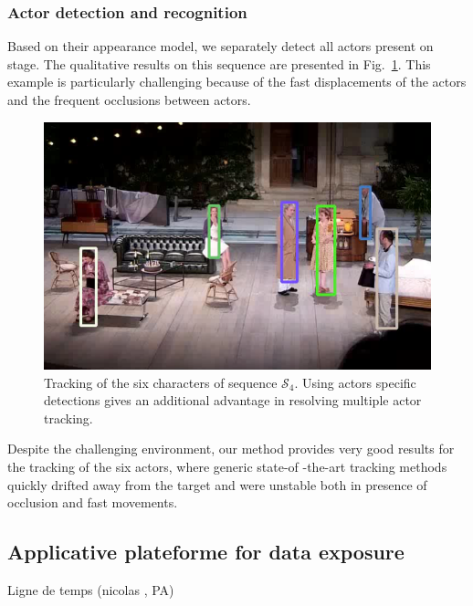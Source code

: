 \documentclass[conference]{IEEEtran}
\begin{document}
\subsubsection{Actor detection and recognition} 

Based on their appearance model, we separately detect all actors present on stage. The qualitative results on this sequence 
are presented in Fig.~\ref{fig_tracking_coahtr}. This example is particularly challenging  because of the fast displacements 
of the actors and the frequent occlusions between actors. 

\begin{figure}[tp]
\centering
\includegraphics[width=\columnwidth]{tracking_coahtr}
\caption{Tracking of  the six characters of sequence $\mathcal{S}_4$. Using actors specific detections gives 
an additional advantage in resolving multiple actor tracking.}
\label{fig_tracking_coahtr}
\end{figure}

Despite the challenging environment, our method provides very good results for the tracking of the six actors, where generic state-of -the-art tracking methods quickly drifted away from the target  and were unstable both in presence of occlusion and fast movements. 





\subsection{Applicative plateforme for data exposure}
Ligne de temps (nicolas , PA)
\end{document}
